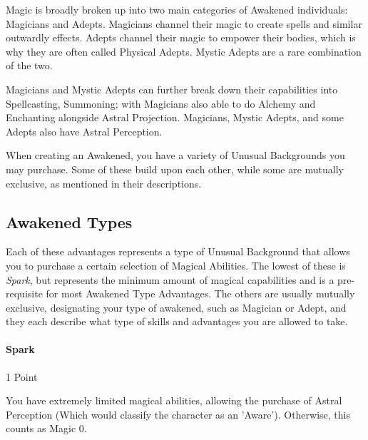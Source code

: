 
\begin{multicols}{3}
	
	Magic is broadly broken up into two main categories of Awakened individuals: Magicians and Adepts. Magicians channel their magic to create spells and similar outwardly effects. Adepts channel their magic to empower their bodies, which is why they are often called Physical Adepts. Mystic Adepts are a rare combination of the two.
	
	Magicians and Mystic Adepts can further break down their capabilities into Spellcasting, Summoning; with Magicians also able to do Alchemy and Enchanting alongside Astral Projection. Magicians, Mystic Adepts, and some Adepts also have Astral Perception.
	
	When creating an Awakened, you have a variety of Unusual Backgrounds you may purchase. Some of these build upon each other, while some are mutually exclusive, as mentioned in their descriptions. 
	
	\subsection{Awakened Types}
	
	Each of these advantages represents a type of Unusual Background that allows you to purchase a certain selection of Magical Abilities. The lowest of these is \textit{Spark}, but represents the minimum amount of magical capabilities and is a pre-requisite for most Awakened Type Advantages. The others are usually mutually exclusive, designating your type of awakened, such as Magician or Adept, and they each describe what type of skills and advantages you are allowed to take.
	
	\paragraph{Spark}\label{spark}
	\begin{flushright}
		1 Point
	\end{flushright}
	
	You have extremely limited magical abilities, allowing the purchase of Astral Perception (Which would classify the character as an 'Aware'). Otherwise, this counts as Magic 0.
	

\end{multicols}
